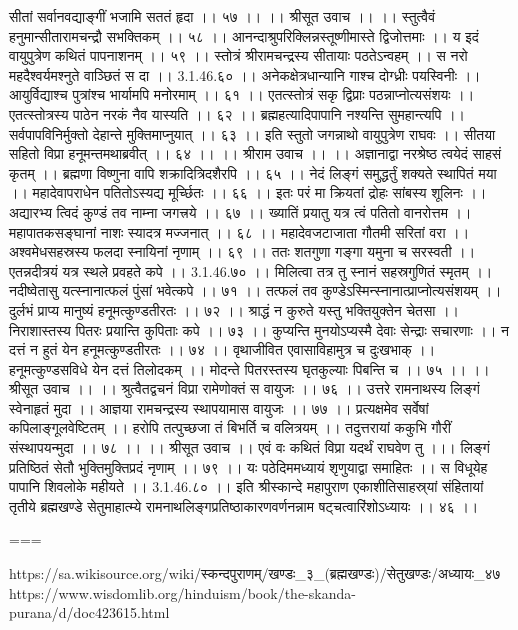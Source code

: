 सीतां सर्वानवद्याङ्गीं भजामि सततं हृदा ।। ५७ ।।
।। श्रीसूत उवाच ।। ।।
स्तुत्वैवं हनुमान्सीतारामचन्द्रौ सभक्तिकम् ।। ५८ ।।
आनन्दाश्रुपरिक्लिन्नस्तूष्णीमास्ते द्विजोत्तमाः ।।
य इदं वायुपुत्रेण कथितं पापनाशनम् ।। ५९ ।।
स्तोत्रं श्रीरामचन्द्रस्य सीतायाः पठतेऽन्वहम् ।।
स नरो महदैश्वर्यमश्नुते वाञ्छितं स दा ।। 3.1.46.६० ।।
अनेकक्षेत्रधान्यानि गाश्च दोग्ध्रीः पयस्विनीः ।।
आयुर्विद्याश्च पुत्रांश्च भार्यामपि मनोरमाम् ।। ६१ ।।
एतत्स्तोत्रं सकृ द्विप्राः पठन्नाप्नोत्यसंशयः ।।
एतत्स्तोत्रस्य पाठेन नरकं नैव यास्यति ।। ६२ ।।
ब्रह्महत्यादिपापानि नश्यन्ति सुमहान्त्यपि ।।
सर्वपापविनिर्मुक्तो देहान्ते मुक्तिमाप्नुयात् ।। ६३ ।।
इति स्तुतो जगन्नाथो वायुपुत्रेण राघवः ।।
सीतया सहितो विप्रा हनूमन्तमथाब्रवीत् ।। ६४ ।।
।। श्रीराम उवाच ।। ।।
अज्ञानाद्वा नरश्रेष्ठ त्वयेदं साहसं कृतम् ।।
ब्रह्मणा विष्णुना वापि शक्रादित्रिदशैरपि ।। ६५ ।।
नेदं लिङ्गं समुद्धर्तुं शक्यते स्थापितं मया ।।
महादेवापराधेन पतितोऽस्यद्य मूर्च्छितः ।। ६६ ।।
इतः परं मा क्रियतां द्रोहः सांबस्य शूलिनः ।।
अद्यारभ्य त्विदं कुण्डं तव नाम्ना जगत्त्रये ।। ६७ ।।
ख्यातिं प्रयातु यत्र त्वं पतितो वानरोत्तम ।।
महापातकसङ्घानां नाशः स्यादत्र मज्जनात् ।। ६८ ।।
महादेवजटाजाता गौतमी सरितां वरा ।।
अश्वमेधसहस्रस्य फलदा स्नायिनां नृणाम् ।। ६९ ।।
ततः शतगुणा गङ्गा यमुना च सरस्वती ।।
एतन्नदीत्रयं यत्र स्थले प्रवहते कपे ।। 3.1.46.७० ।।
मिलित्वा तत्र तु स्नानं सहस्रगुणितं स्मृतम् ।।
नदीष्वेतासु यत्स्नानात्फलं पुंसां भवेत्कपे ।। ७१ ।।
तत्फलं तव कुण्डेऽस्मिन्स्नानात्प्राप्नोत्यसंशयम् ।।
दुर्लभं प्राप्य मानुष्यं हनूमत्कुण्डतीरतः ।। ७२ ।।
श्राद्धं न कुरुते यस्तु भक्तियुक्तेन चेतसा ।।
निराशास्तस्य पितरः प्रयान्ति कुपिताः कपे ।। ७३ ।।
कुप्यन्ति मुनयोऽप्यस्मै देवाः सेन्द्राः सचारणाः ।।
न दत्तं न हुतं येन हनूमत्कुण्डतीरतः ।। ७४ ।।
वृथाजीवित एवासाविहामुत्र च दुःखभाक् ।।
हनूमत्कुण्डसविधे येन दत्तं तिलोदकम् ।।
मोदन्ते पितरस्तस्य घृतकुल्याः पिबन्ति च ।। ७५ ।।
।। श्रीसूत उवाच ।। ।।
श्रुत्वैतद्वचनं विप्रा रामेणोक्तं स वायुजः ।। ७६ ।।
उत्तरे रामनाथस्य लिङ्गं स्वेनाहृतं मुदा ।।
आज्ञया रामचन्द्रस्य स्थापयामास वायुजः ।। ७७ ।।
प्रत्यक्षमेव सर्वेषां कपिलाङ्गूलवेष्टितम् ।।
हरोपि तत्पुच्छजा तं बिभर्ति च वलित्रयम् ।।
तदुत्तरायां ककुभि गौरीं संस्थापयन्मुदा ।। ७८ ।।
।। श्रीसूत उवाच ।।
एवं वः कथितं विप्रा यदर्थं राघवेण तु ।।।
लिङ्गं प्रतिष्ठितं सेतौ भुक्तिमुक्तिप्रदं नृणाम् ।। ७९ ।।
यः पठेदिममध्यायं शृणुयाद्वा समाहितः ।।
स विधूयेह पापानि शिवलोके महीयते ।। 3.1.46.८० ।।
इति श्रीस्कान्दे महापुराण एकाशीतिसाहस्र्यां संहितायां तृतीये ब्रह्मखण्डे सेतुमाहात्म्ये रामनाथलिङ्गप्रतिष्ठाकारणवर्णनन्नाम षट्चत्वारिंशोऽध्यायः ।। ४६ ।।

===

https://sa.wikisource.org/wiki/स्कन्दपुराणम्/खण्डः_३_(ब्रह्मखण्डः)/सेतुखण्डः/अध्यायः_४७
https://www.wisdomlib.org/hinduism/book/the-skanda-purana/d/doc423615.html

